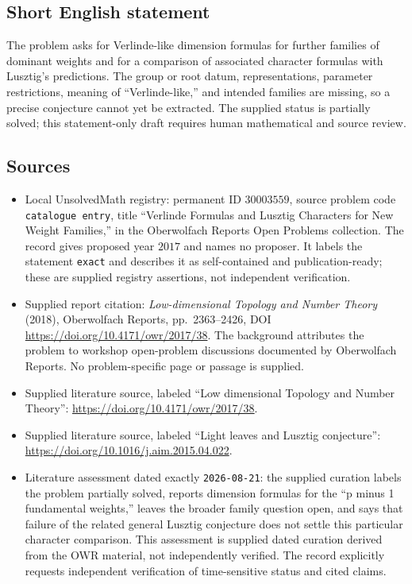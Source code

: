 \documentclass[11pt]{article}
\begin{document}
\subsection{Short English statement}
The problem asks for Verlinde-like dimension formulas for further families of dominant weights and for a comparison of associated character formulas with Lusztig's predictions. The group or root datum, representations, parameter restrictions, meaning of ``Verlinde-like,'' and intended families are missing, so a precise conjecture cannot yet be extracted. The supplied status is partially solved; this statement-only draft requires human mathematical and source review.
\subsection{Sources}
\begin{itemize}
\item Local UnsolvedMath registry: permanent ID \(30003559\), source problem code \texttt{catalogue entry}, title ``Verlinde Formulas and Lusztig Characters for New Weight Families,'' in the Oberwolfach Reports Open Problems collection. The record gives proposed year \(2017\) and names no proposer. It labels the statement \texttt{exact} and describes it as self-contained and publication-ready; these are supplied registry assertions, not independent verification.
\item Supplied report citation: \emph{Low-dimensional Topology and Number Theory} (2018), Oberwolfach Reports, pp.\ 2363--2426, DOI \url{https://doi.org/10.4171/owr/2017/38}. The background attributes the problem to workshop open-problem discussions documented by Oberwolfach Reports. No problem-specific page or passage is supplied.
\item Supplied literature source, labeled ``Low dimensional Topology and Number Theory'': \url{https://doi.org/10.4171/owr/2017/38}.
\item Supplied literature source, labeled ``Light leaves and Lusztig conjecture'': \url{https://doi.org/10.1016/j.aim.2015.04.022}.
\item Literature assessment dated exactly \texttt{2026-08-21}: the supplied curation labels the problem partially solved, reports dimension formulas for the ``p minus 1 fundamental weights,'' leaves the broader family question open, and says that failure of the related general Lusztig conjecture does not settle this particular character comparison. This assessment is supplied dated curation derived from the OWR material, not independently verified. The record explicitly requests independent verification of time-sensitive status and cited claims.
\end{itemize}
\end{document}
